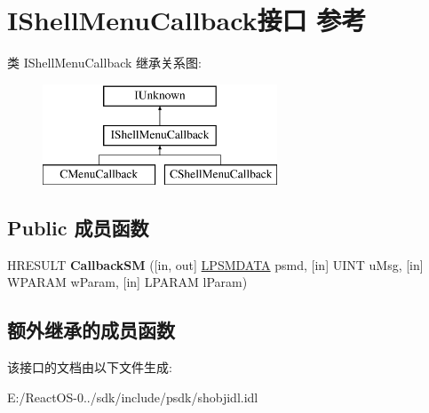 \hypertarget{interface_i_shell_menu_callback}{}\section{I\+Shell\+Menu\+Callback接口 参考}
\label{interface_i_shell_menu_callback}
类 I\+Shell\+Menu\+Callback 继承关系图\+:\begin{figure}[H]
\begin{center}
\leavevmode
\includegraphics[height=3.000000cm]{interface_i_shell_menu_callback}
\end{center}
\end{figure}
\subsection*{Public 成员函数}
\begin{DoxyCompactItemize}
\item 
\mbox{\label{interface_i_shell_menu_callback_afbc180f0eda1588c12d4d85ad9a26401}} 
H\+R\+E\+S\+U\+LT {\bfseries Callback\+SM} (\mbox{[}in, out\mbox{]} \hyperlink{structtag_s_m_d_a_t_a}{L\+P\+S\+M\+D\+A\+TA} psmd, \mbox{[}in\mbox{]} U\+I\+NT u\+Msg, \mbox{[}in\mbox{]} W\+P\+A\+R\+AM w\+Param, \mbox{[}in\mbox{]} L\+P\+A\+R\+AM l\+Param)
\end{DoxyCompactItemize}
\subsection*{额外继承的成员函数}


该接口的文档由以下文件生成\+:\begin{DoxyCompactItemize}
\item 
E\+:/\+React\+O\+S-\/0../sdk/include/psdk/shobjidl.\+idl\end{DoxyCompactItemize}

